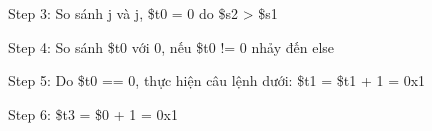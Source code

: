 \documentclass[a4paper,12pt]{article}
\begin{document}
\begin{figure}[!h]
	\centerline{}
	\caption*{Step 3: So sánh j và j, \$t0 = 0 do \$s2 > \$s1}
	\label{fig:s3}
\end{figure}
\begin{figure}[!h]
	\centerline{}
	\caption*{Step 4: So sánh \$t0 với 0, nếu \$t0 != 0 nhảy đến else}
	\label{fig:s4}
\end{figure}
\begin{figure}[!h]
	\centerline{}
	\caption*{Step 5: Do \$t0 == 0, thực hiện câu lệnh dưới: \$t1 = \$t1 + 1 = 0x1}
	\label{fig:s5}
\end{figure}
\begin{figure}[!h]
	\centerline{}
	\caption*{Step 6: \$t3 = \$0 + 1 = 0x1}
	\label{fig:s6}
\end{figure}
\end{document}
